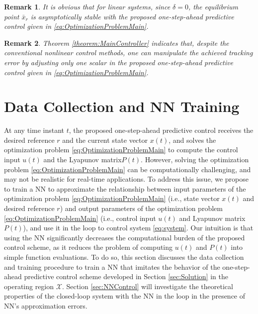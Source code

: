 \documentclass[1p,times]{elsarticle}
\newtheorem{remark}{Remark}
\begin{document}
\begin{remark}
It is obvious that for linear systems, since $\delta=0$, the equilibrium point $\bar{x}_r$ is asymptotically stable with the proposed one-step-ahead predictive control given in \eqref{eq:OptimizationProblemMain}. 
\end{remark}



\begin{remark}
Theorem \ref{theorem:MainController} indicates that, despite the conventional nonlinear control methods, one can manipulate the achieved tracking error by adjusting only one scalar in the proposed one-step-ahead predictive control given in \eqref{eq:OptimizationProblemMain}. 
\end{remark}











\section{Data Collection and NN Training}\label{sec:Training}
{{\color{blue}}
At any time instant $t$, the proposed one-step-ahead predictive control receives the desired reference $r$ and the current state vector $x(t)$, and solves the optimization problem \eqref{eq:OptimizationProblemMain} to compute the control input $u(t)$ and the Lyapunov matrix$P(t)$. However, solving the optimization problem \eqref{eq:OptimizationProblemMain} can be computationally challenging, and may not be realistic for real-time applications. To address this issue, we propose to train a NN to approximate the relationship between input parameters of the optimization problem \eqref{eq:OptimizationProblemMain} (i.e., state vector $x(t)$ and desired reference $r$) and output parameters of the optimization problem \eqref{eq:OptimizationProblemMain} (i.e., control input $u(t)$ and Lyapunov matrix $P(t)$), and use it in the loop to control system \eqref{eq:system}. Our intuition is that using the NN significantly decreases the computational burden of the proposed control scheme, as it reduces the problem of computing $u(t)$ and $P(t)$ into simple function evaluations. To do so, this section discusses the data collection and training procedure to train a NN that imitates the behavior of the one-step-ahead predictive control scheme developed in Section \ref{sec:Solution} in the operating region $\mathcal{X}$. Section \ref{sec:NNControl} will investigate the theoretical properties of the closed-loop system with the NN in the loop in the presence of NN's approximation errors.
}
\end{document}
